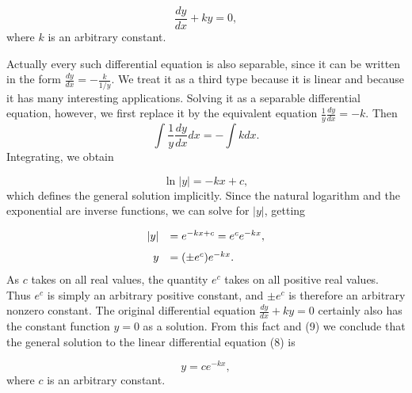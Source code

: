\begin{equation}
\frac{dy}{dx} +ky = 0,
\label{eq5.5.8}
\end{equation}
where $k$ is an arbitrary constant.

Actually every such differential equation is also separable, since it can be written in the form $\frac{dy}{dx} = -\frac{k}{1/y}$. We treat it as a third type because it is
linear and because it has many interesting applications. Solving it as a separable differential equation, however, we first replace it by the equivalent
equation $ \frac{1}{y} \frac{dy}{dx} = - k$. Then  
$$
\int \frac{1}{y} \frac{dy}{dx} dx = - \int k dx.
$$
\noindent Integrating, we obtain 

$$
\ln |y| = -kx + c,
$$
\noindent which defines the general solution implicitly. Since the natural logarithm and the exponential are inverse functions, we can solve for $|y|$, getting

\begin{equation}
\begin{array}{rl}
|y| &= e^{-kx+c} = e^{c} e^{-kx}, \vspace{.1in}\\
  y &= (\pm e^{c})e^{-kx}.   
\end{array}
\label{eq5.5.9}
\end{equation}
\noindent As $c$ takes on all real values, the quantity $e^c$ takes on all positive real values. Thus $e^c$ is simply an arbitrary positive constant, and $\pm e^{c}$ is therefore an arbitrary nonzero constant. The original differential equation $\frac{dy}{dx} + ky = 0$ certainly also has the constant function $y = 0$ as a solution. From this fact and (9) we conclude that the general solution to the linear differential equation (8) is

\begin{equation}
y = ce^{-kx} ,
\label{eq5.5.10}
\end{equation}
\noindent where $c$ is an arbitrary constant.
\medskip

